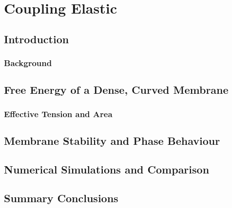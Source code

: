 \chapter{\label{ch:4-coupled}Coupling Elastic} 

\minitoc

\section{Introduction}
\subsection{Background}

\section{Free Energy of a Dense, Curved Membrane}
\subsection{Effective Tension and Area}

\section{Membrane Stability and Phase Behaviour}

\section{Numerical Simulations and Comparison}

\section{Summary Conclusions}
